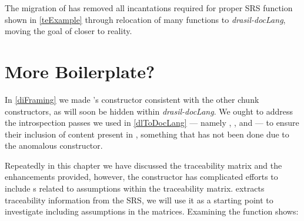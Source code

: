 
%

The migration of  has removed all incantations required for proper SRS function shown in \autoref{teExample} through relocation of many functions to \textit{drasil-docLang}, moving the goal of  closer to reality.


\section{More Boilerplate?}\label{dlMultiplate}

In \autoref{diFraming} we made 's  constructor consistent with the other chunk constructors, as  will soon be hidden within \textit{drasil-docLang}. We ought to address the introspection passes we used in \autoref{dlToDocLang} --- namely , , and  --- to ensure their inclusion of content present in , something that has not been done due to the anomalous constructor.

Repeatedly in this chapter we have discussed the traceability matrix and the enhancements provided, however, the  constructor has complicated efforts to include s related to assumptions within the traceability matrix.  extracts traceability information from the SRS, we will use it as a starting point to investigate including assumptions in the matrices. Examining the function shows:

